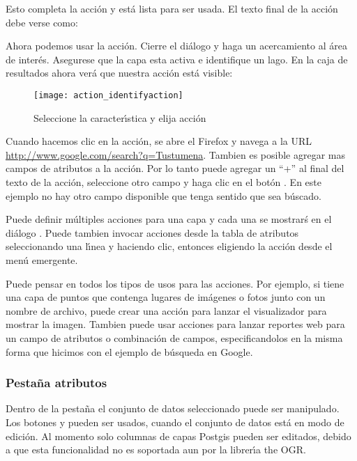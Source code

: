 Esto completa la acci\'on y est\'a lista para ser usada. El texto final de la acci\'on
debe verse como:

\begin{center}
\end{center}

Ahora podemos usar la acci\'on. Cierre el di\'alogo  y haga un acercamiento al \'area
de inter\'es. Asegurese que la capa  esta activa e identifique un
lago. En la caja de resultados ahora ver\'a que nuestra acci\'on est\'a visible:

\begin{figure}[H]
   \begin{center}
   \caption{Seleccione la caracter\'{\i}stica y elija acci\'on \nixcaption}\label{fig:identify_action}\smallskip
   \texttt{[image: action\_identifyaction]} 
\end{center}  
\end{figure}

Cuando hacemos clic en la acci\'on, se abre el Firefox y navega a la URL
\url{http://www.google.com/search?q=Tustumena}. Tambien es posible agregar mas 
campos de atributos a la acci\'on. Por lo tanto puede agregar un ``+'' al final del texto de la acci\'on, 
seleccione otro campo y haga clic en el bot\'on . En este ejemplo no
hay otro campo disponible que tenga sentido que sea b\'uscado.

Puede definir m\'ultiples acciones para una capa y cada una se mostrar\'s en el
di\'alogo . Puede tambien invocar acciones desde la tabla de atributos
seleccionando una l\'{\i}nea y haciendo clic, entonces eligiendo la acci\'on desde el men\'u
emergente.

Puede pensar en todos los tipos de usos para las acciones. Por ejemplo, si tiene una capa de puntos
que contenga lugares de im\'agenes o fotos junto con un nombre de archivo, puede
crear una acci\'on para lanzar el visualizador para mostrar la imagen. Tambien puede usar
acciones para lanzar reportes web para un campo de atributos o combinaci\'on de
campos, especificandolos en la misma forma que hicimos con el ejemplo de b\'usqueda en Google.

\subsubsection{Pesta\~na atributos}\label{label_attributes}
Dentro de la pesta\~na  el conjunto de datos seleccionado puede ser manipulado.
Los botones  y  pueden ser usados,
cuando el conjunto de datos est\'a en modo de edici\'on. Al momento solo columnas
de capas Postgis pueden ser editados, debido a que esta funcionalidad no es soportada aun 
por la librer\'{\i}a the OGR. 

